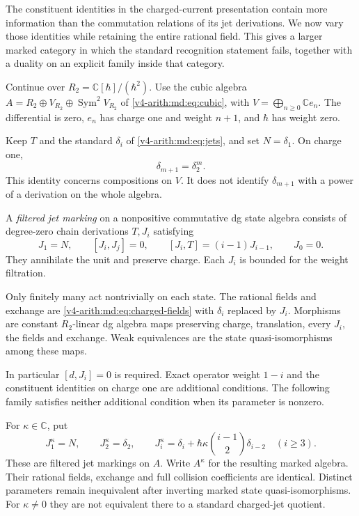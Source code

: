 The constituent identities in the charged-current
presentation contain more information than the
commutation relations of its jet derivations.
We now vary those identities while retaining the
entire rational field. This gives a larger
marked category in which the standard recognition
statement fails, together with a duality on an
explicit family inside that category.

Continue over $R_2=\mathbb C[\hbar]/(\hbar^2)$.
Use the cubic algebra
$A=R_2\oplus V_{R_2}\oplus\operatorname{Sym}^2V_{R_2}$
of \eqref{v4-arith:md:eq:cubic}, with
$V=\bigoplus_{n\geq0}\mathbb Ce_n$.
The differential is zero, $e_n$ has charge one
and weight $n+1$, and $\hbar$ has weight zero.

Keep $T$ and the standard $\delta_i$ of
\eqref{v4-arith:md:eq:jets}, and set $N=\delta_1$.
On charge one,
\[
 \delta_{m+1}=\delta_2^m.
\]
This identity concerns compositions on $V$.
It does not identify $\delta_{m+1}$ with a
power of a derivation on the whole algebra.

\begin{definition}
\label{v4-arith:md:def:filtered-marking}
A \emph{filtered jet marking} on a nonpositive
commutative dg state algebra consists of degree-zero
chain derivations $T,J_i$ satisfying
\[
 J_1=N,\qquad [J_i,J_j]=0,\qquad
 [J_i,T]=(i-1)J_{i-1},\qquad J_0=0.
\]
They annihilate the unit and preserve charge.
Each $J_i$ is bounded for the weight filtration.

Only finitely many act nontrivially on each
state. The rational fields and exchange are
\eqref{v4-arith:md:eq:charged-fields} with
$\delta_i$ replaced by $J_i$.
Morphisms are constant $R_2$-linear dg algebra
maps preserving charge, translation, every
$J_i$, the fields and exchange.
Weak equivalences are the state
quasi-isomorphisms among these maps.
\end{definition}

In particular $[d,J_i]=0$ is required.
Exact operator weight $1-i$ and the constituent
identities on charge one are additional conditions.
The following family satisfies neither additional
condition when its parameter is nonzero.

\begin{proposition}
\label{v4-arith:md:prop:moment-family}
For $\kappa\in\mathbb C$, put
\[
 J_1^\kappa=N,\qquad J_2^\kappa=\delta_2,\qquad
 J_i^\kappa=\delta_i+
       \hbar\kappa\binom{i-1}{2}\delta_{i-2}
       \quad(i\geq3).
\]
These are filtered jet markings on $A$.
Write $A^\kappa$ for the resulting marked algebra.
Their rational fields, exchange and full
collision coefficients are identical.
Distinct parameters remain inequivalent after
inverting marked state quasi-isomorphisms.
For $\kappa\ne0$ they are not equivalent there
to a standard charged-jet quotient.
\end{proposition}

